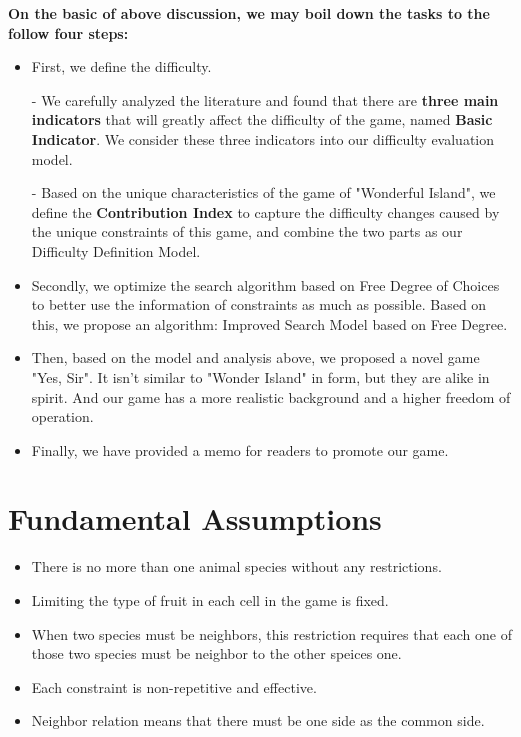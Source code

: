 \documentclass{mcmthesis}
\begin{document}
			\textbf{On the basic of above discussion, we may boil down the tasks to the follow four steps:} 
			
			\begin{itemize}
				\item First, we define the difficulty.
				
				\item[-] We carefully analyzed the literature and found that there are \textbf{three main indicators} that will greatly affect the difficulty of the game, named \textbf{Basic Indicator}. We consider these three indicators into our difficulty evaluation model.
				
				\item[-] Based on the unique characteristics of the game of "Wonderful Island", we define the \textbf{Contribution Index} to capture the difficulty changes caused by the unique constraints of this game, and combine the two parts as our Difficulty Definition Model.
				
				
				\item Secondly, we optimize the search algorithm based on Free Degree of Choices to better use the information of constraints as much as possible. Based on this, we propose an algorithm: Improved Search Model based on Free Degree.
				
				\item Then, based on the model and analysis above, we proposed a novel game "Yes, Sir". It isn't similar to "Wonder Island" in form, but they are alike in spirit. And our game has a more realistic background and a higher freedom of operation.
			
				\item Finally, we have provided a memo for readers to promote our game.
			\end{itemize}
		
			
			
	
	\section{Fundamental Assumptions}
		\begin{itemize}
			\item There is no more than one animal species without any restrictions.
			
			\item Limiting the type of fruit in each cell in the game is fixed.
			
			\item When two species must be neighbors, this restriction requires that each one of those two species must be neighbor to the other speices one.
			
			\item Each constraint is non-repetitive and effective.
			
			\item Neighbor relation means that there must be one side as the common side.
			
		\end{itemize}
\end{document}
